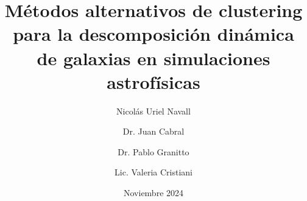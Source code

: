 \documentclass{beamer}
\title[ ] %
{Métodos alternativos de clustering para la descomposición dinámica de galaxias en simulaciones astrofísicas}
\author[N. Navall]{
Nicolás Uriel Navall\inst{1}\\
\and
Dr. Juan Cabral\inst{2}\\ \and Dr. Pablo Granitto\inst{1}\\ \and Lic. Valeria Cristiani\inst{2}
}
\institute[UNR] %
{
  \inst{1} Universidad Nacional de Rosario\\
  Facultad de Ciencias Exactas, Ingeniería y Agrimensura

  \inst{2} Universidad Nacional de Córdoba \\
  Facultad de Matemática, Astronomía, Física y Computación
}
\date[Nov 2024] %
{Noviembre 2024}
\begin{document}
\frame{\titlepage}










\end{document}

